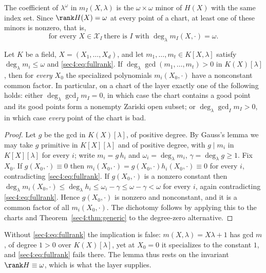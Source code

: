 The coefficient of $\lambda^\omega$ in $m_I(X,\lambda)$ is the $\omega\times\omega$ minor of $H(X)$
with the same index set. Since $\rank H(X)=\omega$ at every point of a chart, at least one of these
minors is nonzero, that is,
\begin{equation}
\label{sec4:eq:fullrank}
\text{for every }X\in\mathcal X_I\ \text{there is }I\text{ with }
\deg_\lambda m_I(X,\cdot)=\omega .
\end{equation}

\begin{lem}
\label{sec4:lem:fullrank}
\label{sec4:cor:dichotomy}
Let $K$ be a field, $X=(X_1,\dots,X_d)$, and let $m_1,\dots,m_t\in K[X,\lambda]$ satisfy
$\deg_\lambda m_i\le\omega$ and \eqref{sec4:eq:fullrank}. If
$\deg_\lambda\gcd(m_1,\dots,m_t)>0$ in $K(X)[\lambda]$, then for \emph{every} $X_0$ the specialized
polynomials $m_i(X_0,\cdot)$ have a nonconstant common factor. In particular, on a chart of the layer
exactly one of the following holds: either $\deg_\lambda\gcd_I m_I=0$, in which case the chart contains
a good point and its good points form a nonempty Zariski open subset; or
$\deg_\lambda\gcd_I m_I>0$, in which case \emph{every} point of the chart is bad.
\end{lem}

\begin{proof}
Let $g$ be the gcd in $K(X)[\lambda]$, of positive degree. By Gauss's lemma \cite{lan02} we may take
$g$ primitive in $K[X][\lambda]$ and of positive degree, with $g\mid m_i$ in $K[X][\lambda]$ for every
$i$; write $m_i=g\,h_i$ and $\omega_i=\deg_\lambda m_i$, $\gamma=\deg_\lambda g\ge1$. Fix $X_0$. If
$g(X_0,\cdot)\equiv0$ then $m_i(X_0,\cdot)=g(X_0,\cdot)h_i(X_0,\cdot)\equiv0$ for every $i$,
contradicting \eqref{sec4:eq:fullrank}. If $g(X_0,\cdot)$ is a nonzero constant then
$\deg_\lambda m_i(X_0,\cdot)\le\deg_\lambda h_i\le\omega_i-\gamma\le\omega-\gamma<\omega$ for every
$i$, again contradicting \eqref{sec4:eq:fullrank}. Hence $g(X_0,\cdot)$ is nonzero and nonconstant, and
it is a common factor of all $m_i(X_0,\cdot)$. The dichotomy follows by applying this to the charts and
Theorem~\ref{sec4:thm:generic} to the degree-zero alternative.
\end{proof}

Without \eqref{sec4:eq:fullrank} the implication is false: $m(X,\lambda)=X\lambda+1$ has gcd $m$, of
degree $1>0$ over $K(X)[\lambda]$, yet at $X_0=0$ it specializes to the constant $1$, and
\eqref{sec4:eq:fullrank} fails there. The lemma thus rests on the invariant $\rank H\equiv\omega$,
which is what the layer supplies.

